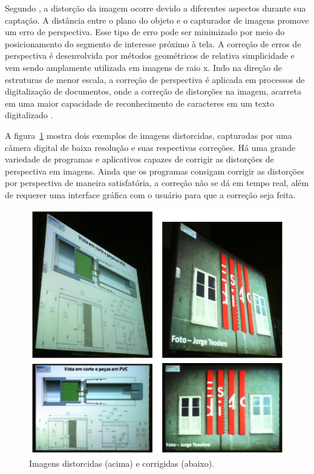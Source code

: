 Segundo , a distorção da imagem ocorre devido a diferentes aspectos durante sua captação. A distância entre o plano do objeto e o capturador de imagens promove um erro de perspectiva. Esse tipo de erro pode ser minimizado por meio do posicionamento do segmento de interesse próximo à tela. A correção de erros de perspectiva é desenvolvida por métodos geométricos de relativa simplicidade e vem sendo amplamente utilizada em imagens de raio x. Indo na direção de estruturas de menor escala, a correção de perspectiva é aplicada em processos de digitalização de documentos, onde a correção de distorções na imagem, acarreta em uma maior capacidade de reconhecimento de caracteres em um texto digitalizado \cite{Pereira}. 

A figura~\ref{fig:imagensdistorcidas} mostra dois exemplos de imagens distorcidas, capturadas por uma câmera digital de baixa resolução e suas respectivas correções. Há uma grande variedade de programas e aplicativos capazes de corrigir as distorções de perspectiva em imagens. Ainda que os programas consigam corrigir as distorções por perspectiva de maneira satisfatória, a correção não se dá em tempo real, além de requerer uma interface gráfica com o usuário para que a correção seja feita.
 \begin{figure}[!h]
	\centering
	\includegraphics[width=1.0\textwidth]{Imagens/imagensdistorcidas} 
	\caption[Imagens distorcidas e corrigidas.]{Imagens distorcidas (acima) e corrigidas (abaixo).}
	\label{fig:imagensdistorcidas}
\end{figure}

